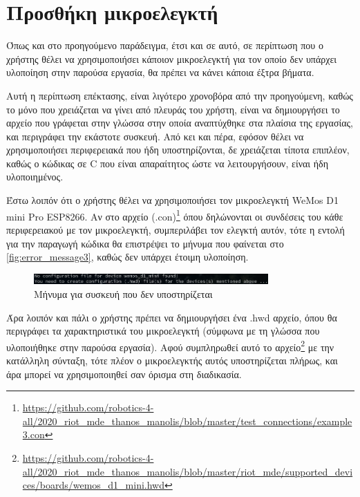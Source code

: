 \section{Προσθήκη μικροελεγκτή}
\label{sec:example3}

Όπως και στο προηγούμενο παράδειγμα, έτσι και σε αυτό, σε περίπτωση που ο χρήστης θέλει να χρησιμοποιήσει κάποιον μικροελεγκτή για τον οποίο δεν υπάρχει υλοποίηση στην παρούσα εργασία, θα πρέπει να κάνει κάποια έξτρα βήματα.

Αυτή η περίπτωση επέκτασης, είναι λιγότερο χρονοβόρα από την προηγούμενη, καθώς το μόνο που χρειάζεται να γίνει από πλευράς του χρήστη, είναι να δημιουργήσει το αρχείο που γράφεται στην γλώσσα στην οποία αναπτύχθηκε στα πλαίσια της εργασίας, και περιγράφει την εκάστοτε συσκευή. Από κει και πέρα, εφόσον θέλει να χρησιμοποιήσει περιφερειακά που ήδη υποστηρίζονται, δε χρειάζεται τίποτα επιπλέον, καθώς ο κώδικας σε C που είναι απαραίτητος ώστε να λειτουργήσουν, είναι ήδη υλοποιημένος.

Έστω λοιπόν ότι ο χρήστης θέλει να χρησιμοποιήσει τον μικροελεγκτή WeMos D1 mini Pro ESP8266. Αν στο αρχείο (.con)\footnote{\url{https://github.com/robotics-4-all/2020_riot_mde_thanos_manolis/blob/master/test_connections/example3.con}} όπου δηλώνονται οι συνδέσεις του κάθε περιφερειακού με τον μικροελεγκτή, συμπεριλάβει τον ελεγκτή αυτόν, τότε η εντολή για την παραγωγή κώδικα θα επιστρέψει το μήνυμα που φαίνεται στο \autoref{fig:error_message3}, καθώς δεν υπάρχει έτοιμη υλοποίηση.

\begin{figure}[!ht]
	\centering
	\includegraphics[width=0.8\textwidth]{./images/chapter6/error_message3.png}
	\caption{Μήνυμα για συσκευή που δεν υποστηρίζεται}
	\label{fig:error_message3}
\end{figure}

Άρα λοιπόν και πάλι ο χρήστης πρέπει να δημιουργήσει ένα .hwd αρχείο, όπου θα περιγράφει τα χαρακτηριστικά του μικροελεγκτή (σύμφωνα με τη γλώσσα που υλοποιήθηκε στην παρούσα εργασία). Αφού συμπληρωθεί αυτό το αρχείο\footnote{\url{https://github.com/robotics-4-all/2020_riot_mde_thanos_manolis/blob/master/riot_mde/supported_devices/boards/wemos_d1_mini.hwd}} με την κατάλληλη σύνταξη, τότε πλέον ο μικροελεγκτής αυτός υποστηρίζεται πλήρως, και άρα μπορεί να χρησιμοποιηθεί σαν όρισμα στη διαδικασία.